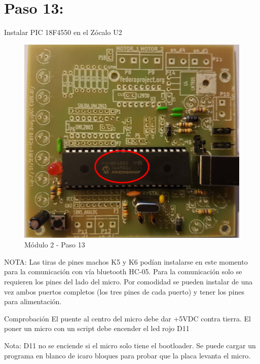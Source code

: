 \newpage

\section{Paso 13:}

Instalar PIC 18F4550 en el Zócalo U2

\begin{figure}[h]
	\centering
	\includegraphics[width=0.8\linewidth]{Modulo_2/M2_13}
	\caption{Módulo 2 - Paso 13}
	\label{fig:M2_13}
\end{figure}

\newpage


NOTA: Las tiras de pines machos K5 y K6 podían instalarse en este momento para la comunicación con vía bluetooth HC-05. Para la comunicación solo se requieren los pines del lado del micro. Por comodidad se pueden instalar de una vez ambos puertos completos (los tres pines de cada puerto) y tener los pines para alimentación.

Comprobación
El puente al centro del micro debe dar +5VDC contra tierra.
El poner un micro con un script debe encender el led rojo D11

Nota: D11 no se enciende si el micro solo tiene el bootloader. Se puede cargar un programa en blanco de icaro bloques para probar que la placa levanta el micro. 

